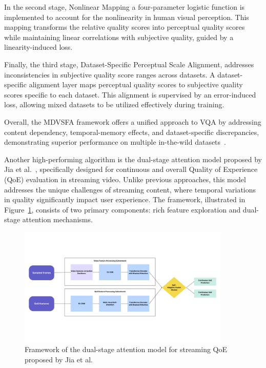 In the second stage, Nonlinear Mapping a four-parameter logistic function is implemented to account for the nonlinearity in human visual perception. This mapping transforms the relative quality scores into perceptual quality scores while maintaining linear correlations with subjective quality, guided by a linearity-induced loss.

Finally, the third stage, Dataset-Specific Perceptual Scale Alignment, addresses inconsistencies in subjective quality score ranges across datasets. A dataset-specific alignment layer maps perceptual quality scores to subjective quality scores specific to each dataset. This alignment is supervised by an error-induced loss, allowing mixed datasets to be utilized effectively during training.

Overall, the MDVSFA framework offers a unified approach to VQA by addressing content dependency, temporal-memory effects, and dataset-specific discrepancies, demonstrating superior performance on multiple in-the-wild datasets~\cite{li2023unified}.

Another high-performing algorithm is the dual-stage attention model proposed by Jia et al.~\cite{jia2024continuous}, specifically designed for continuous and overall Quality of Experience (QoE) evaluation in streaming video. Unlike previous approaches, this model addresses the unique challenges of streaming content, where temporal variations in quality significantly impact user experience. The framework, illustrated in Figure~\ref{fig:framework3}, consists of two primary components: rich feature exploration and dual-stage attention mechanisms.

\begin{figure}
\centering
\includegraphics[width=0.9\textwidth]{figures/dual-attention-framework.png}
\caption{Framework of the dual-stage attention model for streaming QoE proposed by Jia et al.~\cite{jia2024continuous}}
\label{fig:framework3}
\end{figure}

